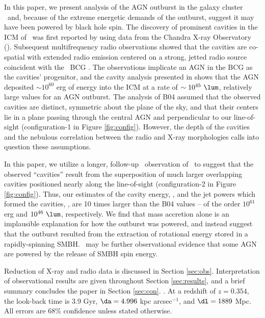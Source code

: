 \documentclass[11pt, preprint]{aastex}
\begin{document}
In this paper, we present analysis of the AGN outburst in the galaxy
cluster \rbs\ and, because of the extreme energetic demands of the
outburst, suggest it may have been powered by black hole spin. The
discovery of prominent cavities in the ICM of \rbs\ was first reported
by \citet{schindler01} using data from the Chandra X-ray Observatory
(\cxo). Subsequent multifrequency radio observations showed that the
cavities are co-spatial with extended radio emission centered on a
strong, jetted radio source coincident with the \rbs\ BCG
\citep{2002astro.ph..1349D, gitti06, birzan08}. The observations
implicate an AGN in the BCG as the cavities' progenitor, and the
cavity analysis presented in \citet[][hereafter B04]{birzan04} shows
that the AGN deposited $\sim 10^{60}$ erg of energy into the ICM at a
rate of $\sim 10^{45} ~\lum$, relatively large values for an AGN
outburst. The analysis of B04 assumed that the observed cavities are
distinct, symmetric about the plane of the sky, and that their centers
lie in a plane passing through the central AGN and perpendicular to
our line-of-sight (configuration-1 in Figure
\ref{fig:config}). However, the depth of the cavities and the nebulous
correlation between the radio and X-ray morphologies calls into
question these assumptions.

In this paper, we utilize a longer, follow-up \cxo\ observation of
\rbs\ to suggest that the observed ``cavities'' result from the
superposition of much larger overlapping cavities positioned nearly
along the line-of-sight (configuration-2 in Figure
\ref{fig:config}). Thus, our estimates of the cavity energy, \ecav,
and the jet powers which formed the cavities, \pjet, are 10 times
larger than the B04 values -- of the order $10^{61}$ erg and $10^{46}
~\lum$, respectively. We find that mass accretion alone is an
implausible explanation for how the outburst was powered, and instead
suggest that the outburst resulted from the extraction of rotational
energy stored in a rapidly-spinning SMBH. \rbs\ may be further
observational evidence that some AGN are powered by the release of
SMBH spin energy. 

Reduction of X-ray and radio data is discussed in Section
\ref{sec:obs}. Interpretation of observational results are given
throughout Section \ref{sec:results}, and a brief summary concludes
the paper in Section \ref{sec:con}. \LCDM. At a redshift of $z =
0.354$, the look-back time is 3.9 Gyr, $\da = 4.996$ kpc
arcsec$^{-1}$, and $\dl = 1889$ Mpc. All errors are 68\% confidence
unless stated otherwise.
\end{document}
